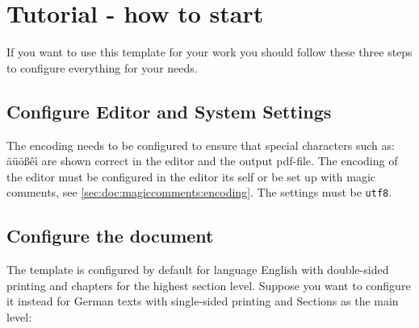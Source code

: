 \section{Tutorial - how to start}
\label{sec:doc:start}

If you want to use this template for your work you should follow these three steps to configure everything for your needs.

\subsection{Configure Editor and System Settings}
\label{sec:doc:config:editor}

The encoding needs to be configured to ensure that special characters such as: äüößêì are shown correct in the editor and the output pdf-file. The encoding of the editor must be configured in the editor its self or be set up with magic comments, see \cref{sec:doc:magiccomments:encoding}. The settings must be \texttt{utf8}.


\subsection{Configure the document}
\label{sec:doc:config:latex}
The template is configured by default for language English with double-sided printing and chapters for the highest section level. Suppose you want to configure it instead for German texts with single-sided printing and Sections as the main level:

